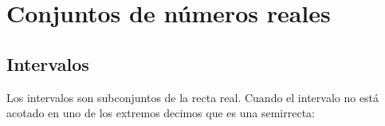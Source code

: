 %
%
%
%
%
%
%
%
%
%
%
%

\section{Conjuntos de números reales}
\subsection{Intervalos}
Los intervalos son subconjuntos de la recta real. Cuando el intervalo no está acotado en uno de los extremos decimos que es una semirrecta:

